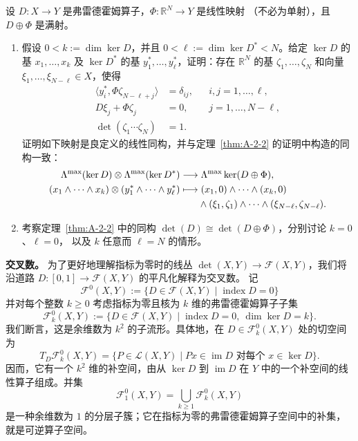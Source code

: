 \begin{exercise}\label{ex:A-2-3}
设 $D:X\to Y$ 是弗雷德霍姆算子，$\Phi:\mathbb R^N\to Y$ 是线性映射
（不必为单射），且 $D\oplus\Phi$ 是满射。
\begin{enumerate}[label=(\roman*)]
\item 假设 $0<k:=\dim\ker D$，并且
$0<\ell:=\dim\ker D^*<N$。给定 $\ker D$ 的基
$x_1,\ldots,x_k$ 及 $\ker D^*$ 的基
$y_1^*,\ldots,y_\ell^*$，证明：存在 $\mathbb R^N$ 的基
$\zeta_1,\ldots,\zeta_N$ 和向量
$\xi_1,\ldots,\xi_{N-\ell}\in X$，使得
\[
\begin{aligned}
  \langle y_i^*,\Phi\zeta_{N-\ell+j}\rangle
    &=\delta_{ij}, &&i,j=1,\ldots,\ell,\\
  D\xi_j+\Phi\zeta_j&=0, &&j=1,\ldots,N-\ell,\\
  \det(\zeta_1\cdots\zeta_N)&=1.&&
\end{aligned}
\]
证明如下映射是良定义的线性同构，并与定理~\ref{thm:A-2-2} 的证明中构造的同构一致：
\[
\begin{aligned}
  \Lambda^{\max}(\ker D)\otimes\Lambda^{\max}(\ker D^*)
   &\longrightarrow\Lambda^{\max}\ker(D\oplus\Phi),\\
  (x_1\wedge\cdots\wedge x_k)
  \otimes(y_1^*\wedge\cdots\wedge y_\ell^*)
   &\longmapsto(x_1,0)\wedge\cdots\wedge(x_k,0)\\
   &\hphantom{\longmapsto{}}\wedge(\xi_1,\zeta_1)
   \wedge\cdots\wedge(\xi_{N-\ell},\zeta_{N-\ell}).
\end{aligned}
\]
\item 考察定理~\ref{thm:A-2-2} 中的同构
$\det(D)\cong\det(D\oplus\Phi)$，分别讨论 $k=0$、$\ell=0$，
以及 $k$ 任意而 $\ell=N$ 的情形。
\end{enumerate}
\end{exercise}

\noindent\textbf{交叉数。}
为了更好地理解指标为零时的线丛
$\det(X,Y)\to\mathcal F(X,Y)$，我们将沿道路
$D:[0,1]\to\mathcal F(X,Y)$ 的平凡化解释为交叉数。
记
\[
  \mathcal F^0(X,Y):=\bigl\{D\in\mathcal F(X,Y)
  \mid\operatorname{index}D=0\bigr\}
\]
并对每个整数 $k\ge0$ 考虑指标为零且核为 $k$ 维的弗雷德霍姆算子子集
\[
  \mathcal F_k^0(X,Y):=\bigl\{D\in\mathcal F(X,Y)
  \mid\operatorname{index}D=0,\ \dim\ker D=k\bigr\}.
\]
我们断言，这是余维数为 $k^2$ 的子流形。具体地，在
$D\in\mathcal F_k^0(X,Y)$ 处的切空间为
\[
  T_D\mathcal F_k^0(X,Y)
  =\bigl\{P\in\mathcal L(X,Y)\mid
  Px\in\operatorname{im}D\text{ 对每个 }x\in\ker D\bigr\}.
\]
因而，它有一个 $k^2$ 维的补空间，由从 $\ker D$ 到
$\operatorname{im}D$ 在 $Y$ 中的一个补空间的线性算子组成。并集
\[
  \mathcal F_1^0(X,Y)
  =\bigcup_{k\ge1}\mathcal F_k^0(X,Y)
\]
是一种余维数为 $1$ 的分层子簇；它在指标为零的弗雷德霍姆算子空间中的补集，
就是可逆算子空间。

